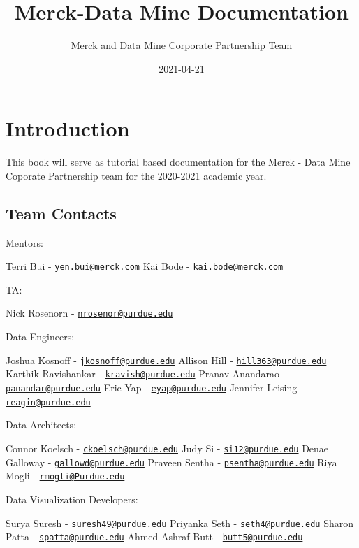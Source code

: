 \documentclass[]{book}
\title{Merck-Data Mine Documentation}
\author{Merck and Data Mine Corporate Partnership Team}
\date{2021-04-21}
\begin{document}
\maketitle

{
\setcounter{tocdepth}{1}
\tableofcontents
}
\chapter{Introduction}\label{introduction}

This book will serve as tutorial based documentation for the Merck -
Data Mine Coporate Partnership team for the 2020-2021 academic year.

\section{Team Contacts}\label{team-contacts}

Mentors:

Terri Bui -
\href{mailto:yen.bui@merck.com}{\nolinkurl{yen.bui@merck.com}} Kai Bode
- \href{mailto:kai.bode@merck.com}{\nolinkurl{kai.bode@merck.com}}

TA:

Nick Rosenorn -
\href{mailto:nrosenor@purdue.edu}{\nolinkurl{nrosenor@purdue.edu}}

Data Engineers:

Joshua Kosnoff -
\href{mailto:jkosnoff@purdue.edu}{\nolinkurl{jkosnoff@purdue.edu}}
Allison Hill -
\href{mailto:hill363@purdue.edu}{\nolinkurl{hill363@purdue.edu}} Karthik
Ravishankar -
\href{mailto:kravish@purdue.edu}{\nolinkurl{kravish@purdue.edu}} Pranav
Anandarao -
\href{mailto:panandar@purdue.edu}{\nolinkurl{panandar@purdue.edu}} Eric
Yap - \href{mailto:eyap@purdue.edu}{\nolinkurl{eyap@purdue.edu}}
Jennifer Leising -
\href{mailto:reagin@purdue.edu}{\nolinkurl{reagin@purdue.edu}}

Data Architects:

Connor Koelsch -
\href{mailto:ckoelsch@purdue.edu}{\nolinkurl{ckoelsch@purdue.edu}} Judy
Si - \href{mailto:si12@purdue.edu}{\nolinkurl{si12@purdue.edu}} Denae
Galloway -
\href{mailto:gallowd@purdue.edu}{\nolinkurl{gallowd@purdue.edu}} Praveen
Sentha -
\href{mailto:psentha@purdue.edu}{\nolinkurl{psentha@purdue.edu}} Riya
Mogli - \href{mailto:rmogli@Purdue.edu}{\nolinkurl{rmogli@Purdue.edu}}

Data Visualization Developers:

Surya Suresh -
\href{mailto:suresh49@purdue.edu}{\nolinkurl{suresh49@purdue.edu}}
Priyanka Seth -
\href{mailto:seth4@purdue.edu}{\nolinkurl{seth4@purdue.edu}} Sharon
Patta - \href{mailto:spatta@purdue.edu}{\nolinkurl{spatta@purdue.edu}}
Ahmed Ashraf Butt -
\href{mailto:butt5@purdue.edu}{\nolinkurl{butt5@purdue.edu}}
\end{document}
